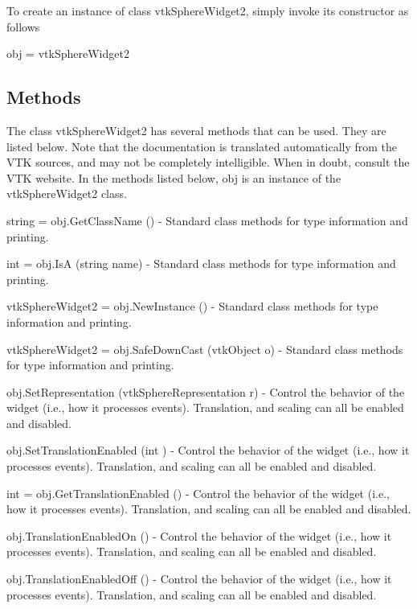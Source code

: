 To create an instance of class vtk\-Sphere\-Widget2, simply invoke its constructor as follows \begin{DoxyVerb}  obj = vtkSphereWidget2
\end{DoxyVerb}
 \hypertarget{vtkwidgets_vtkxyplotwidget_Methods}{}\subsection{Methods}\label{vtkwidgets_vtkxyplotwidget_Methods}
The class vtk\-Sphere\-Widget2 has several methods that can be used. They are listed below. Note that the documentation is translated automatically from the V\-T\-K sources, and may not be completely intelligible. When in doubt, consult the V\-T\-K website. In the methods listed below, {\ttfamily obj} is an instance of the vtk\-Sphere\-Widget2 class. 
\begin{DoxyItemize}
\item {\ttfamily string = obj.\-Get\-Class\-Name ()} -\/ Standard class methods for type information and printing.  
\item {\ttfamily int = obj.\-Is\-A (string name)} -\/ Standard class methods for type information and printing.  
\item {\ttfamily vtk\-Sphere\-Widget2 = obj.\-New\-Instance ()} -\/ Standard class methods for type information and printing.  
\item {\ttfamily vtk\-Sphere\-Widget2 = obj.\-Safe\-Down\-Cast (vtk\-Object o)} -\/ Standard class methods for type information and printing.  
\item {\ttfamily obj.\-Set\-Representation (vtk\-Sphere\-Representation r)} -\/ Control the behavior of the widget (i.\-e., how it processes events). Translation, and scaling can all be enabled and disabled.  
\item {\ttfamily obj.\-Set\-Translation\-Enabled (int )} -\/ Control the behavior of the widget (i.\-e., how it processes events). Translation, and scaling can all be enabled and disabled.  
\item {\ttfamily int = obj.\-Get\-Translation\-Enabled ()} -\/ Control the behavior of the widget (i.\-e., how it processes events). Translation, and scaling can all be enabled and disabled.  
\item {\ttfamily obj.\-Translation\-Enabled\-On ()} -\/ Control the behavior of the widget (i.\-e., how it processes events). Translation, and scaling can all be enabled and disabled.  
\item {\ttfamily obj.\-Translation\-Enabled\-Off ()} -\/ Control the behavior of the widget (i.\-e., how it processes events). Translation, and scaling can all be enabled and disabled.  

\end{DoxyItemize}
